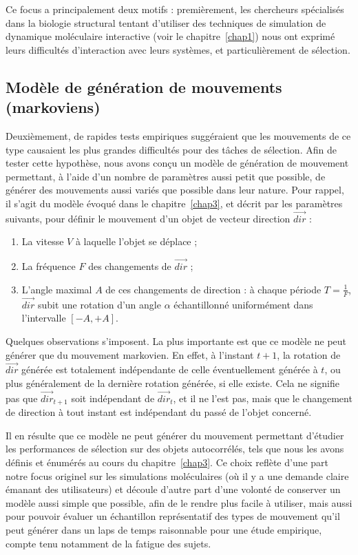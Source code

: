 	Ce focus a principalement deux motifs : premièrement, les chercheurs spécialisés dans la biologie structural tentant d'utiliser des techniques de simulation de dynamique moléculaire interactive (voir le chapitre~\ref{chap1}) nous ont exprimé leurs difficultés d'interaction avec leurs systèmes, et particulièrement de sélection.
	
	\subsection{Modèle de génération de mouvements (markoviens)}
	
	Deuxièmement, de rapides tests empiriques suggéraient que les mouvements de ce type causaient les plus grandes difficultés pour des tâches de sélection. Afin de tester cette hypothèse, nous avons conçu un modèle de génération de mouvement permettant, à l'aide d'un nombre de paramètres aussi petit que possible, de générer des mouvements aussi variés que possible dans leur nature. Pour rappel, il s'agit du modèle évoqué dans le chapitre~\ref{chap3}, et décrit par les paramètres suivants, pour définir le mouvement d'un objet de vecteur direction $\vec{dir}$ :
	
    \begin{enumerate}
    	\item La vitesse $V$ à laquelle l'objet se déplace ;
    	\item La fréquence $F$ des changements de $\vec{dir}$ ;
    	\item L'angle maximal $A$ de ces changements de direction : à chaque période $T = \frac{1}{F}$, $\vec{dir}$ subit une rotation d'un angle $\alpha$ échantillonné uniformément dans l'intervalle $[-A, +A]$.
    \end{enumerate}
    
    Quelques observations s'imposent. La plus importante est que ce modèle ne peut générer que du mouvement markovien. En effet, à l'instant $t+1$, la rotation de $\vec{dir}$ générée est totalement indépendante de celle éventuellement générée à $t$, ou plus généralement de la dernière rotation générée, si elle existe. Cela ne signifie pas que $\vec{dir}_{t+1}$ soit indépendant de $\vec{dir}_{t}$, et il ne l'est pas, mais que le changement de direction à tout instant est indépendant du passé de l'objet concerné.
    
    Il en résulte que ce modèle ne peut générer du mouvement permettant d'étudier les performances de sélection sur des objets autocorrélés, tels que nous les avons définis et énumérés au cours du chapitre~\ref{chap3}. Ce choix reflète d'une part notre focus originel sur les simulations moléculaires (où il y a une demande claire émanant des utilisateurs) et découle d'autre part d'une volonté de conserver un modèle aussi simple que possible, afin de le rendre plus facile à utiliser, mais aussi pour pouvoir évaluer un échantillon représentatif des types de mouvement qu'il peut générer dans un laps de temps raisonnable pour une étude empirique, compte tenu notamment de la fatigue des sujets.
    
